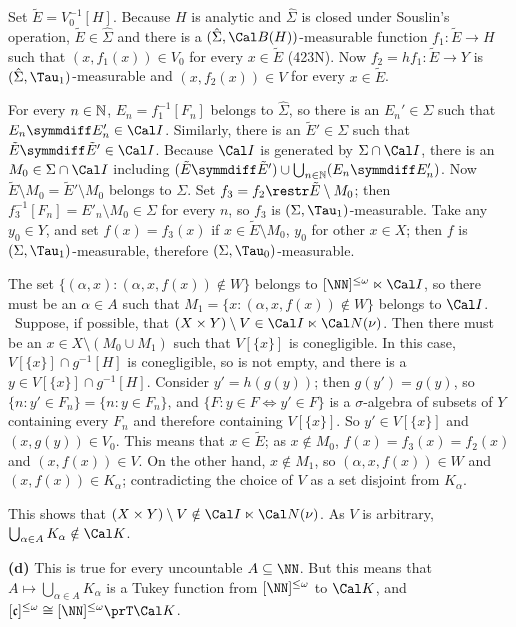{Set $\tilde E=V_0^{-1}[H]$.   Because
$H$ is analytic and $\hat\Sigma$ is closed under Souslin's operation,
$\tilde E\in\hat\Sigma$ and there is a
$(\hat\Sigma,\Cal B(H))$-measurable function $f_1:\tilde E\to H$ such
that $(x,f_1(x))\in V_0$ for every $x\in\tilde E$ (423N).
Now $f_2=hf_1:\tilde E\to Y$ is $(\hat\Sigma,\Tau_1)$-measurable and
$(x,f_2(x))\in V$ for every $x\in \tilde E$.

For every $n\in\Bbb N$, $E_n=f_1^{-1}[F_n]$ belongs to $\hat\Sigma$, so
there is an $E_n'\in\Sigma$ such that $E_n\symmdiff E'_n\in\Cal I$.
Similarly, there is an $\tilde E'\in\Sigma$
such that $\tilde E\symmdiff\tilde E'\in\Cal I$.   Because $\Cal I$ is
generated by $\Sigma\cap\Cal I$, there is an $M_0\in\Sigma\cap\Cal I$ including
$(\tilde E\symmdiff\tilde E')\cup\bigcup_{n\in\Bbb N}(E_n\symmdiff E'_n)$.
Now $\tilde E\setminus M_0=\tilde E'\setminus M_0$
belongs to $\Sigma$.   Set $f_3=f_2\restr\tilde E\setminus M_0$;  then
$f_3^{-1}[F_n]=E'_n\setminus M_0\in\Sigma$ for every $n$, so $f_3$ is
$(\Sigma,\Tau_1)$-measurable.   Take any
$y_0\in Y$, and set $f(x)=f_3(x)$ if $x\in\tilde E\setminus M_0$, $y_0$
for other $x\in X$;  then $f$ is $(\Sigma,\Tau_1)$-measurable, therefore
$(\Sigma,\Tau_0)$-measurable.

The set $\{(\alpha,x):(\alpha,x,f(x))\notin W\}$ belongs to
$[\NN]^{\le\omega}\ltimes\Cal I$, so there must be an $\alpha\in A$ such
that $M_1=\{x:(\alpha,x,f(x))\notin W\}$ belongs
to $\Cal I$.   \Quer\ Suppose, if possible, that
$(X\times Y)\setminus V\in\Cal I\ltimes\Cal N(\nu)$.
Then there must be an $x\in X\setminus(M_0\cup M_1)$
such that $V[\{x\}]$ is conegligible.   In this case,
$V[\{x\}]\cap g^{-1}[H]$ is conegligible, so is not empty, and there
is a $y\in V[\{x\}]\cap g^{-1}[H]$.   Consider
$y'=h(g(y))$;  then $g(y')=g(y)$, so $\{n:y'\in F_n\}=\{n:y\in F_n\}$,
and $\{F:y\in F\iff y'\in F\}$ is a $\sigma$-algebra of subsets of $Y$
containing every $F_n$ and therefore
containing $V[\{x\}]$.   So $y'\in V[\{x\}]$ and $(x,g(y))\in V_0$.
This means that $x\in\tilde E$;  as $x\notin M_0$, $f(x)=f_3(x)=f_2(x)$
and $(x,f(x))\in V$.   On the other
hand, $x\notin M_1$, so $(\alpha,x,f(x))\in W$ and $(x,f(x))\in
K_{\alpha}$;  contradicting the choice of $V$ as a set disjoint from
$K_{\alpha}$.\ \Bang

This shows that $(X\times Y)\setminus V\notin\Cal I\ltimes\Cal N(\nu)$.
As $V$ is arbitrary, $\bigcup_{\alpha\in A}K_{\alpha}\notin\Cal K$.

\medskip

{\bf (d)} This is true for every uncountable $A\subseteq\NN$.   But this
means that $A\mapsto\bigcup_{\alpha\in A}K_{\alpha}$ is a Tukey function
from $[\NN]^{\le\omega}$ to
$\Cal K$, and $[\frak c]^{\le\omega}\cong[\NN]^{\le\omega}\prT\Cal K$.

}
